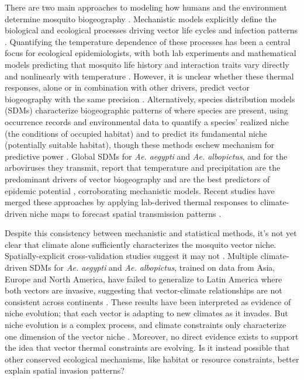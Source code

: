 There are two main approaches to modeling how humans and the environment determine mosquito biogeography \cite{Tjaden2018-zi}. Mechanistic models explicitly define the biological and ecological processes driving vector life cycles and infection patterns \cite{Costa2010-cx, Carrington2013-qp, Mordecai2013-sb}. Quantifying the temperature dependence of these processes has been a central focus for ecological epidemiologists, with both lab experiments and mathematical models predicting that mosquito life history and interaction traits vary directly and nonlinearly with temperature \cite{Brown2004-cw, Mordecai2017-tb, Shocket2018-xi}. However, it is unclear whether these thermal responses, alone or in combination with other drivers, predict vector biogeography with the same precision \cite{Tjaden2018-zi}. Alternatively, species distribution models (SDMs) characterize biogeographic patterns of where species are present, using occurrence records and environmental data to quantify a species’ realized niche (the conditions of occupied habitat) and to predict its fundamental niche (potentially suitable habitat), though these methods eschew mechanism for predictive power \cite{Grinnell1917-aa, Soberon2005-cn, Wiens2009-sb}. Global SDMs for \textit{Ae. aegypti} and \textit{Ae. albopictus}, and for the arboviruses they transmit, report that temperature and precipitation are the predominant drivers of vector biogeography and are the best predictors of epidemic potential \cite{Brady2014-ti, Liu-Helmersson2014-cd, Kraemer2015-ct}, corroborating mechanistic models. Recent studies have merged these approaches by applying lab-derived thermal responses to climate-driven niche maps to forecast spatial transmission patterns \cite{Tjaden2017-af, Mweya2016-cv}. 

Despite this consistency between mechanistic and statistical methods, it’s not yet clear that climate alone sufficiently characterizes the mosquito vector niche. Spatially-explicit cross-validation studies suggest it may not \cite{Liu2020-wk}. Multiple climate-driven SDMs for \textit{Ae. aegypti} and \textit{Ae. albopictus}, trained on data from Asia, Europe and North America, have failed to generalize to Latin America where both vectors are invasive, suggesting that vector-climate relationships are not consistent across continents \cite{Medley2010-fa, Carlson2016-rc, Pech-May2016-vs}. These results have been interpreted as evidence of niche evolution; that each vector is adapting to new climates as it invades. But niche evolution is a complex process, and climate constraints only characterize one dimension of the vector niche \cite{Wiens2010-ce, Hortal2015-gc, Diniz-Filho2019-cd}. Moreover, no direct evidence exists to support the idea that vector thermal constraints are evolving. Is it instead possible that other conserved ecological mechanisms, like habitat or resource constraints, better explain spatial invasion patterns?

